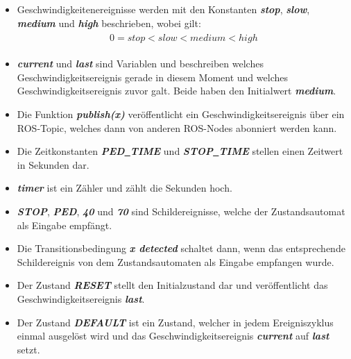 \begin{itemize}
\item Geschwindigkeitenereignisse werden mit den Konstanten \textbf{\textit{stop}}, \textbf{\textit{slow}}, \textbf{\textit{medium}} und \textbf{\textit{high}} beschrieben, wobei gilt:
\begin{align}
\begin{split}
\label{vel_vergleich}
0 = stop < slow < medium < high
\end{split}
\end{align}

\item \textbf{\textit{current}} und \textbf{\textit{last}} sind Variablen und beschreiben welches Geschwindigkeitsereignis gerade in diesem Moment und welches Geschwindigkeitsereignis zuvor galt. Beide haben den Initialwert \textbf{\textit{medium}}.

\item Die Funktion \textbf{\textit{publish(x)}} ver\"offentlicht ein Geschwindigkeitsereignis \"uber ein ROS-Topic, welches dann von anderen ROS-Nodes abonniert werden kann.

\item Die Zeitkonstanten \textbf{\textit{PED\underline{\ }TIME}} und \textbf{\textit{STOP\underline{\ }TIME}} stellen einen Zeitwert in Sekunden dar.

\item \textbf{\textit{timer}} ist ein Z\"ahler und z\"ahlt die Sekunden hoch.

\item \textbf{\textit{STOP}}, \textbf{\textit{PED}}, \textbf{\textit{40}} und \textbf{\textit{70}} sind Schildereignisse, welche der Zustandsautomat als Eingabe empf\"angt. 

\item Die Transitionsbedingung \textbf{\textit{x detected}} schaltet dann, wenn das entsprechende Schildereignis von dem Zustandsautomaten als Eingabe empfangen wurde.

\item Der Zustand \textbf{\textit{RESET}} stellt den Initialzustand dar und ver\"offentlicht das Geschwindigkeitsereignis \textbf{\textit{last}}.

\item Der Zustand \textbf{\textit{DEFAULT}} ist ein Zustand, welcher in jedem Ereigniszyklus einmal ausgel\"ost wird und das Geschwindigkeitsereignis \textbf{\textit{current}} auf \textbf{\textit{last}} setzt.

\end{itemize}


